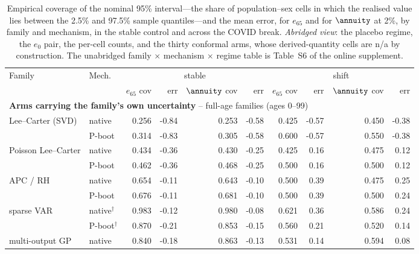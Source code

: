 \begin{table}[tbp]
\centering
\caption{Empirical coverage of the nominal 95\% interval---the share of population--sex cells in which the realised value lies between the 2.5\% and 97.5\% sample quantiles---and the mean error, for $e_{65}$ and for $\annuity$ at 2\%, by family and mechanism, in the stable control and across the COVID break. \emph{Abridged view}: the placebo regime, the $e_0$ pair, the per-cell counts, and the thirty conformal arms, whose derived-quantity cells are n/a by construction. The unabridged family $\times$ mechanism $\times$ regime table is Table~S6 of the online supplement.}\label{tab:h5-actuarial-main}
\begin{threeparttable}\scriptsize\renewcommand{\arraystretch}{0.90}\setlength{\tabcolsep}{2.5pt}
\begin{tabular}{@{}llrrrrrrrr@{}}
\toprule
Family & Mech. & \multicolumn{4}{c}{stable} & \multicolumn{4}{c}{shift} \\
 &  & $e_{65}$ cov & err & $\annuity$ cov & err & $e_{65}$ cov & err & $\annuity$ cov & err \\
\midrule
\multicolumn{10}{l}{\textbf{Arms carrying the family's own uncertainty} -- full-age families (ages 0--99)} \\
\midrule
Lee--Carter (SVD) & native & 0.256 & -0.84 & 0.253 & -0.58 & 0.425 & -0.57 & 0.450 & -0.38 \\
 & P-boot & 0.314 & -0.83 & 0.305 & -0.58 & 0.600 & -0.57 & 0.550 & -0.38 \\
Poisson Lee--Carter & native & 0.434 & -0.36 & 0.430 & -0.25 & 0.425 & 0.16 & 0.475 & 0.12 \\
 & P-boot & 0.462 & -0.36 & 0.468 & -0.25 & 0.500 & 0.16 & 0.500 & 0.12 \\
APC / RH & native & 0.654 & -0.11 & 0.643 & -0.10 & 0.500 & 0.39 & 0.475 & 0.25 \\
 & P-boot & 0.676 & -0.11 & 0.681 & -0.10 & 0.500 & 0.39 & 0.500 & 0.24 \\
sparse VAR & native$^{\dagger}$ & 0.983 & -0.12 & 0.980 & -0.08 & 0.621 & 0.36 & 0.586 & 0.24 \\
 & P-boot$^{\dagger}$ & 0.870 & -0.21 & 0.853 & -0.15 & 0.560 & 0.21 & 0.520 & 0.14 \\
multi-output GP & native & 0.840 & -0.18 & 0.863 & -0.13 & 0.531 & 0.14 & 0.594 & 0.08 \\

\end{tabular}
\end{threeparttable}
\end{table}
